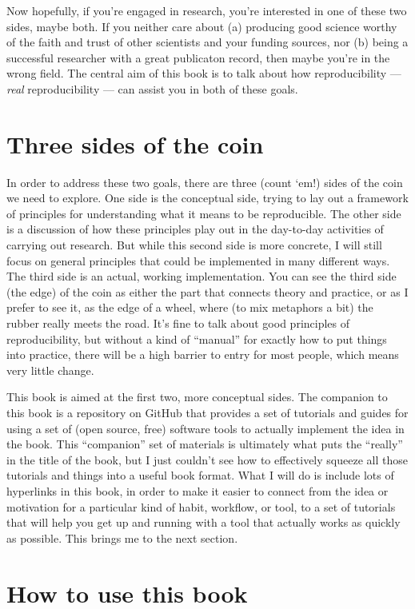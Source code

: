 \documentclass{book}
\begin{document}
Now hopefully, if you're engaged in research, you're interested in one of these two sides, maybe both. If you neither care about (a) producing good science worthy of the faith and trust of other scientists and your funding sources, nor (b) being a successful researcher with a great publicaton record, then maybe you're in the wrong field.  The central aim of this book is to talk about how reproducibility --- \emph{real} reproducibility --- can assist you in both of these goals.
\section{Three sides of the coin}
\label{sec-1-2}

In order to address these two goals, there are three (count `em!) sides of the coin we need to explore.  One side is the conceptual side, trying to lay out a framework of principles for understanding what it means to be reproducible.  The other side is a discussion of how these principles play out in the day-to-day activities of carrying out research.  But while this second side is more concrete, I will still focus on general principles that could be implemented in many different ways.  The third side is an actual, working implementation. You can see the third side (the edge) of the coin as either the part that connects theory and practice, or as I prefer to see it, as the edge of a wheel, where (to mix metaphors a bit) the rubber really meets the road.  It's fine to talk about good principles of reproducibility, but without a kind of ``manual'' for exactly how to put things into practice, there will be a high barrier to entry for most people, which means very little change.

This book is aimed at the first two, more conceptual sides.  The companion to this book is a repository on GitHub that provides a set of tutorials and guides for using a set of (open source, free) software tools to actually implement the idea in the book.  This ``companion'' set of materials is ultimately what puts the ``really'' in the title of the book, but I just couldn't see how to effectively squeeze all those tutorials and things into a useful book format.  What I will do is include lots of hyperlinks in this book, in order to make it easier to connect from the idea or motivation for a particular kind of habit, workflow, or tool, to a set of tutorials that will help you get up and running with a tool that actually works as quickly as possible.  This brings me to the next section.
\section{How to use this book}
\label{sec-1-3}
\end{document}
